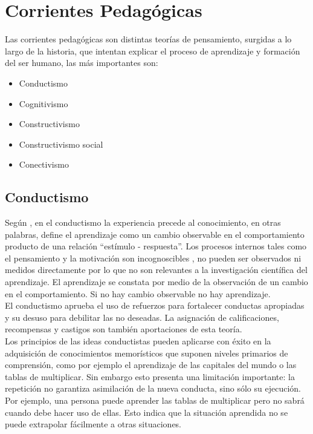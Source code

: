 \section{Corrientes Pedagógicas}
Las corrientes pedagógicas son distintas teorías de pensamiento, surgidas a lo largo de la historia, que intentan explicar el proceso de aprendizaje y formación del ser humano, las más importantes son:
\begin{itemize}
	\item Conductismo
	\item Cognitivismo
	\item Constructivismo
	\item Constructivismo social
	\item Conectivismo
\end{itemize}

\subsection{Conductismo}
Según \citeauthor{Conductismo_Manosalva1996}, en el conductismo la experiencia precede al conocimiento, en otras palabras, define el aprendizaje como un cambio observable en el comportamiento producto de una relación ``estímulo - respuesta''. Los procesos internos tales como el pensamiento y la motivación son incognoscibles \citep{Conductismo_Manosalva1996}, no pueden ser observados ni medidos directamente por lo que no son relevantes a la investigación científica del aprendizaje.
El aprendizaje se constata por medio de la observación de un cambio en el comportamiento. Si no hay cambio observable no hay aprendizaje.\\

El conductismo aprueba el uso de refuerzos para fortalecer conductas apropiadas y su desuso para debilitar las no deseadas. La asignación de calificaciones, recompensas y castigos son también aportaciones de esta teoría.\\

Los principios de las ideas conductistas pueden aplicarse con éxito en la adquisición de conocimientos memorísticos que suponen niveles primarios de comprensión, como por ejemplo el aprendizaje de las capitales del mundo o las tablas de multiplicar. Sin embargo esto presenta una limitación importante: la repetición no garantiza asimilación de la nueva conducta, sino sólo su ejecución. Por ejemplo, una persona puede aprender las tablas de multiplicar pero no sabrá cuando debe hacer uso de ellas. Esto indica que la situación aprendida no se puede extrapolar fácilmente a otras situaciones.\\

